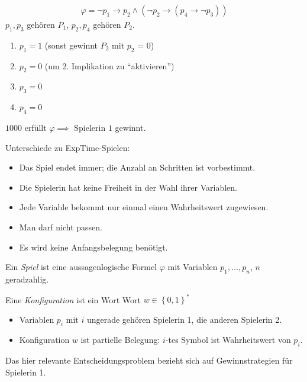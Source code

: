 \begin{tafel}
    \begin{align*}
        \varphi = \neg p_1 \rightarrow p_2 \wedge (\neg p_2 \rightarrow (p_4 \rightarrow \neg p_3))
    \end{align*}
    $p_1, p_3$ gehören $P_1$, $p_2, p_4$ gehören $P_2$.
    \begin{enumerate}
        \item $p_1 = 1$ (sonst gewinnt $P_2$ mit $p_2$ = 0)
        \item $p_2 = 0$ (um 2. Implikation zu \enquote{aktivieren})
        \item $p_3 = 0$
        \item $p_4 = 0$
    \end{enumerate}
    $1000$ erfüllt $\varphi \implies$ Spielerin $1$ gewinnt.
\end{tafel}

Unterschiede zu ExpTime-Spielen:
\begin{itemize}
    \item Das Spiel endet immer; die Anzahl an Schritten ist vorbestimmt.
    \item Die Spielerin hat keine Freiheit in der Wahl ihrer Variablen.
    \item Jede Variable bekommt nur einmal einen Wahrheitswert zugewiesen.
    \item Man darf nicht passen.
    \item Es wird keine Anfangsbelegung benötigt.
\end{itemize}

\begin{definition}
Ein \emph{Spiel} ist eine aussagenlogische Formel $\varphi$ mit Variablen
  $p_1,\ldots,p_{n}$, $n$ geradzahlig.

  Eine \emph{Konfiguration} ist ein Wort Wort $w \in {\left\{ 0,1 \right\}}^*$
\end{definition}

\begin{itemize}
    \item Variablen $p_i$ mit $i$ ungerade gehören Spielerin 1, die anderen Spielerin 2.
    \item Konfiguration $w$ ist partielle Belegung: $i$-tes Symbol ist Wahrheitswert von $p_i$.
\end{itemize}

Das hier relevante Entscheidungsproblem bezieht sich auf Gewinnstrategien für Spielerin 1.

